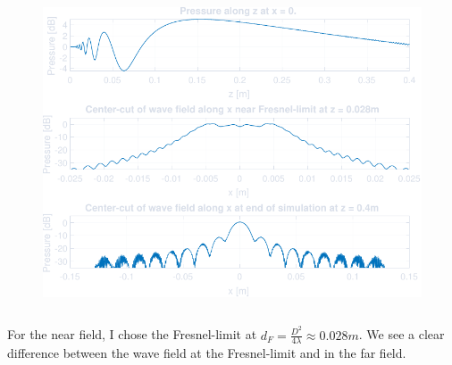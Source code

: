 \documentclass[compress]{beamer}
\begin{document}
\begin{frame}[fragile]
\begin{columns}
\begin{column}{0.5\textwidth}
\begin{figure}
                \includegraphics[width=\columnwidth]{"../2b.pdf"}
            \end{figure}
        \end{column}
    \end{columns}
    \vspace{1mm}
    For the near field, I chose the Fresnel-limit
    at $d_F = \frac{D^2}{4λ} \approx 0.028m$. We see a clear difference between the
    wave field at the Fresnel-limit and in the far field.
\end{frame}
\end{document}

